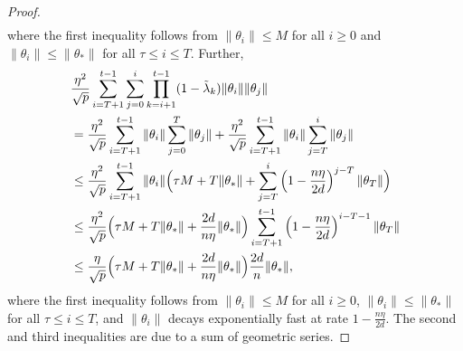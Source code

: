 \begin{proof}
\begin{align*}
    \end{align*}
    where the first inequality follows from $\|\theta_i\|\leq M$ for all $i\geq 0$ and $\|\theta_i\|\leq \|\theta_*\|$ for all $\tau\leq i\leq T$. Further, 
    \begin{align*}
        & \frac{\eta^2}{\sqrt p}\sum_{i=T+1}^{t-1}\sum_{j=0}^i\prod_{k=i+1}^{t-1}(1-\tilde{\lambda}_k) \|\theta_i\|\|\theta_j\| \\
        & = \frac{\eta^2}{\sqrt p}\sum_{i=T+1}^{t-1} \|\theta_i\| \sum_{j=0}^T \|\theta_j\| + \frac{\eta^2}{\sqrt p}\sum_{i=T+1}^{t-1} \|\theta_i\| \sum_{j=T}^i\|\theta_j\| \\
        & \leq \frac{\eta^2}{\sqrt p}\sum_{i=T+1}^{t-1} \|\theta_i\| \Big( \tau M + T\|\theta_*\| + \sum_{j=T}^i \left( 1-\frac{n\eta}{2d} \right)^{j-T} \|\theta_T\| \Big) \\
        & \leq \frac{\eta^2}{\sqrt p} \Big( \tau M + T\|\theta_*\| + \frac{2d}{n\eta} \|\theta_*\| \Big) \sum_{i=T+1}^{t-1} \left( 1-\frac{n\eta}{2d} \right)^{i-T-1} \|\theta_T\| \\
        & \leq \frac{\eta}{\sqrt p} \Big( \tau M + T\|\theta_*\| + \frac{2d}{n\eta} \|\theta_*\| \Big) \frac{2d}{n} \|\theta_*\|,
    \end{align*}
    where the first inequality follows from $\|\theta_i\|\leq M$ for all $i\geq 0$, $\|\theta_i\|\leq \|\theta_*\|$ for all $\tau\leq i\leq T$, and $\|\theta_i\|$ decays exponentially fast at rate $1-\frac{n\eta}{2d}$. The second and third inequalities are due to a sum of geometric series.
    

\end{proof}
